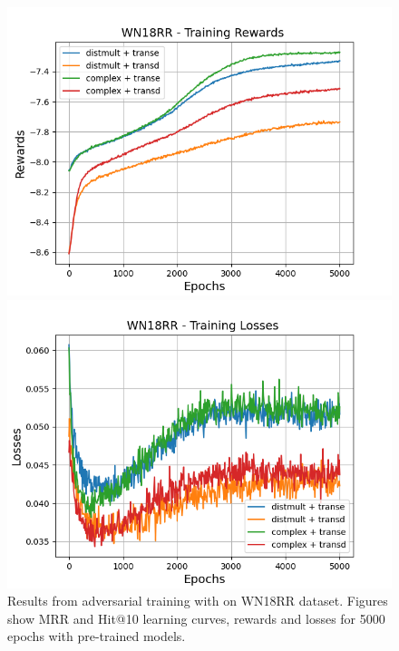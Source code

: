 \begin{figure}
    \begin{minipage}{.5\textwidth}
      \centering
      \includegraphics[width=\linewidth]{figures/results/gan_train/pretrained/random/wn18rr/gan_train_random_wn18rr_rewards.png}
    \end{minipage}%
     \begin{minipage}{.5\textwidth}
      \centering
      \includegraphics[width=\linewidth]{figures/results/gan_train/pretrained/random/wn18rr/gan_train_random_wn18rr_losses.png}
    \end{minipage}%
    \caption{Results from adversarial training with \origsampling on \textsc{WN18RR} dataset.
    Figures show MRR and Hit@10 learning curves, rewards and losses for 5000 epochs with pre-trained models.}
    \label{fig:gan_train_pretrained_random_wn18rr}
\end{figure}
